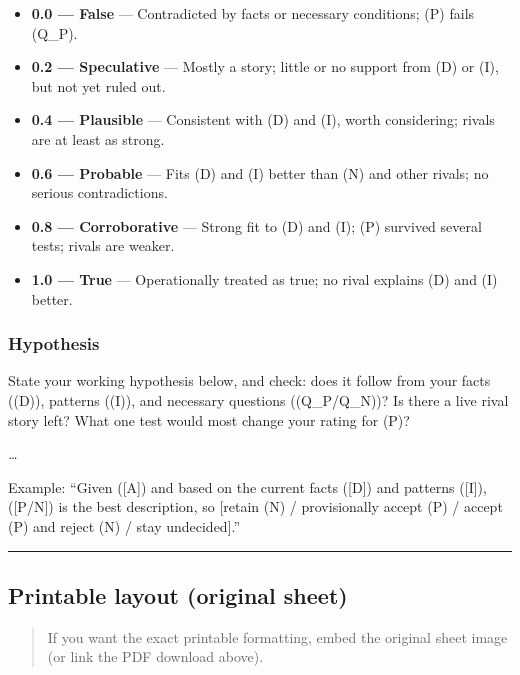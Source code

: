 \documentclass[
  letterpaper,
  DIV=11,
  numbers=noendperiod]{scrartcl}
\providecommand{\tightlist}{%
  \setlength{\itemsep}{0pt}\setlength{\parskip}{0pt}}
\begin{document}
\begin{itemize}
\tightlist
\item[$\square$]
  \textbf{0.0 --- False} --- Contradicted by facts or necessary
  conditions; (P) fails (Q\_P).
\item[$\square$]
  \textbf{0.2 --- Speculative} --- Mostly a story; little or no support
  from (D) or (I), but not yet ruled out.
\item[$\square$]
  \textbf{0.4 --- Plausible} --- Consistent with (D) and (I), worth
  considering; rivals are at least as strong.
\item[$\square$]
  \textbf{0.6 --- Probable} --- Fits (D) and (I) better than (N) and
  other rivals; no serious contradictions.
\item[$\square$]
  \textbf{0.8 --- Corroborative} --- Strong fit to (D) and (I); (P)
  survived several tests; rivals are weaker.
\item[$\square$]
  \textbf{1.0 --- True} --- Operationally treated as true; no rival
  explains (D) and (I) better.
\end{itemize}

\subsubsection{Hypothesis}\label{hypothesis-1}

State your working hypothesis below, and check: does it follow from your
facts ((D)), patterns ((I)), and necessary questions ((Q\_P/Q\_N))? Is
there a live rival story left? What one test would most change your
rating for (P)?

\emph{\ldots{}}

Example: ``Given ({[}A{]}) and based on the current facts ({[}D{]}) and
patterns ({[}I{]}), ({[}P/N{]}) is the best description, so {[}retain
(N) / provisionally accept (P) / accept (P) and reject (N) / stay
undecided{]}.''

\begin{center}\rule{0.5\linewidth}{0.5pt}\end{center}

\subsection{Printable layout (original
sheet)}\label{printable-layout-original-sheet}

\begin{quote}
If you want the exact printable formatting, embed the original sheet
image (or link the PDF download above).
\end{quote}
\end{document}
